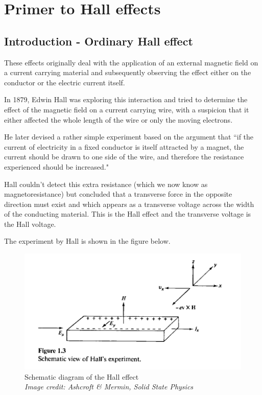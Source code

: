 \chapter{Primer to Hall effects}

\label{chapter2}

\section{Introduction - Ordinary Hall effect}

These effects originally deal with the application of an external magnetic field on a current carrying material and subsequently observing the effect either on the conductor or the electric current itself.

In 1879, Edwin Hall was exploring this interaction and tried to determine the effect of the magnetic field on a current carrying wire, with a suspicion that it either affected the whole length of the wire or only the moving electrons.

He later devised a rather simple experiment based on the argument that ``if the current of electricity in a fixed conductor is itself attracted by a magnet, the current should be drawn to one side of the wire, and therefore the resistance experienced should be increased." \cite{S.1880}

Hall couldn't detect this extra resistance (which we now know as magnetoresistance) but concluded that a transverse force in the opposite direction must exist and which appears as a transverse voltage across the width of the conducting material.
This is the Hall effect and the transverse voltage is the Hall voltage.

The experiment by Hall is shown in the figure below.

\begin{figure}[h!]
    \includegraphics[width=0.7\columnwidth]{hall-effect-ashcroft.png}
    \caption{Schematic diagram of the Hall effect\\ \textit{Image credit: Ashcroft \& Mermin, Solid State Physics}  }
    \label{hall-figure}
\end{figure}

